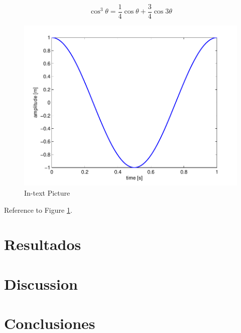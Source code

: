 \documentclass[fleqn,10pt]{AmateCodex} %
\begin{document}
\begin{equation}
\cos^3 \theta =\frac{1}{4}\cos\theta+\frac{3}{4}\cos 3\theta
\label{eq:refname2}
\end{equation}

\begin{figure}[ht]\centering
\includegraphics[width=\linewidth]{imagenes/results}
\caption{In-text Picture}
\label{fig:results}
\end{figure}

Reference to Figure \ref{fig:results}.


\section{Resultados}


\section{Discussion}


\section{Conclusiones}

\end{document}
